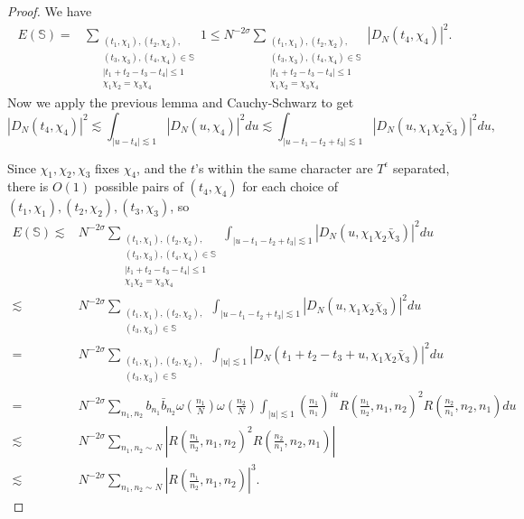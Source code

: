 \begin{proof}
    We have \begin{align*}    
    E(\mathbb{S})=& \sum_{\substack{(t_1,\chi_1),(t_2,\chi_2),\\ (t_3,\chi_3),(t_4,\chi_4)\in \mathbb{S}\\|t_1+t_2-t_3-t_4|\leq 1\\ \chi_1\chi_2=\chi_3\chi_4}} 1 
    \leq N^{-2\sigma}\sum_{\substack{(t_1,\chi_1),(t_2,\chi_2),\\ (t_3,\chi_3),(t_4,\chi_4)\in \mathbb{S}\\ |t_1+t_2-t_3-t_4|\leq 1\\ \chi_1\chi_2=\chi_3\chi_4}} |D_N(t_4,\chi_4)|^2.
    \end{align*}
    Now we apply the previous lemma and Cauchy-Schwarz to get \[
        |D_N(t_4,\chi_4)|^2\lesssim \int_{|u-t_4|\lesssim 1} |D_N(u,\chi_4)|^2du \lesssim  \int_{|u-t_1-t_2+t_3|\lesssim 1} |D_N(u,\chi_1\chi_2\bar{\chi}_3)|^2du,
    \]
   
    Since $\chi_1,\chi_2,\chi_3$ fixes $\chi_4$, and the $t$'s within the same character are $T^\epsilon$ separated, there is $O(1)$ possible pairs of $(t_4,\chi_4)$ for each choice of $(t_1,\chi_1),(t_2,\chi_2),(t_3,\chi_3)$, so \begin{align*}    
        E(\mathbb{S})\lesssim& N^{-2\sigma}\sum_{\substack{(t_1,\chi_1),(t_2,\chi_2),\\ (t_3,\chi_3),(t_4,\chi_4)\in \mathbb{S}\\ |t_1+t_2-t_3-t_4|\leq 1\\ \chi_1\chi_2=\chi_3\chi_4}} \int_{|u-t_1-t_2+t_3|\lesssim 1} |D_N(u,\chi_1\chi_2\bar{\chi}_3)|^2du\\
        \lesssim&  N^{-2\sigma}\sum_{\substack{(t_1,\chi_1),(t_2,\chi_2),\\ (t_3,\chi_3)\in \mathbb{S}}} \int_{|u-t_1-t_2+t_3|\lesssim 1} |D_N(u,\chi_1\chi_2\bar{\chi}_3)|^2du\\
        =& N^{-2\sigma}\sum_{\substack{(t_1,\chi_1),(t_2,\chi_2),\\ (t_3,\chi_3)\in \mathbb{S}}} \int_{|u|\lesssim 1} |D_N(t_1+t_2-t_3 + u,\chi_1\chi_2\bar{\chi}_3)|^2du\\
        =&N^{-2\sigma}\sum_{n_1,n_2} b_{n_1}\bar{b}_{n_2} \omega\left(\frac{n_1}{N}\right)\omega\left(\frac{n_2}{N}\right)\int_{|u|\lesssim 1} \left(\frac{n_1}{n_1}\right)^{iu}R\left(\frac{n_1}{n_2},n_1,n_2\right)^2 R\left(\frac{n_2}{n_1},n_2,n_1\right)du\\
        \lesssim & N^{-2\sigma}\sum_{n_1,n_2\sim N}\left|R\left(\frac{n_1}{n_2},n_1,n_2\right)^2 R\left(\frac{n_2}{n_1},n_2,n_1\right)\right|\\
        \lesssim & N^{-2\sigma}\sum_{n_1,n_2\sim N}\left|R\left(\frac{n_1}{n_2},n_1,n_2\right) \right|^3.
        \end{align*}
\end{proof}

